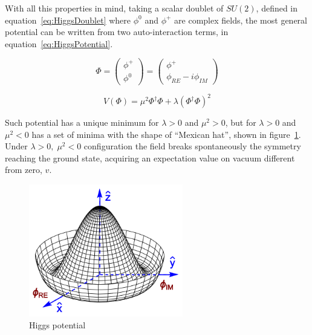 With all this properties in mind, taking a scalar doublet of $SU(2)$, defined in equation~\ref{eq:HiggsDoublet} where $\phi^{0}$ and $\phi^{+}$ are complex fields, the most general potential can be written from two auto-interaction terms, in equation~\ref{eq:HiggsPotential}.

\begin{equation}
  \label{eq:HiggsDoublet}
  \Phi=\left(
    \begin{array}{c}
      \phi^{+} \\
      \phi^{0}
    \end{array}
  \right)=\left(
    \begin{array}{c}
      \phi^{+} \\
      \phi_{RE}-i\phi_{IM}
    \end{array}
  \right)
\end{equation}

\begin{equation}
  \label{eq:HiggsPotential}
  V(\Phi)=\mu^{2}\Phi^{\dagger}\Phi+\lambda(\Phi^{\dagger}\Phi)^{2}
\end{equation}

Such potential has a unique minimum for $\lambda>0$ and $\mu^{2}>0$, but for $\lambda>0$ and $\mu^{2}<0$ has a set of minima with the shape of ``Mexican hat'', shown in figure~\ref{fig:MexicanHat}. Under $\lambda>0,\;\mu^{2}<0$ configuration the field breaks spontaneously the symmetry reaching the ground state, acquiring an expectation value on vacuum different from zero, $v$. 

\begin{figure}[!Hhtbp]
  \begin{center}
    \includegraphics[width=0.6\textwidth]{figs/Mexican_hat.png}
    \caption{Higgs potential}
    \label{fig:MexicanHat}
  \end{center}
\end{figure}

